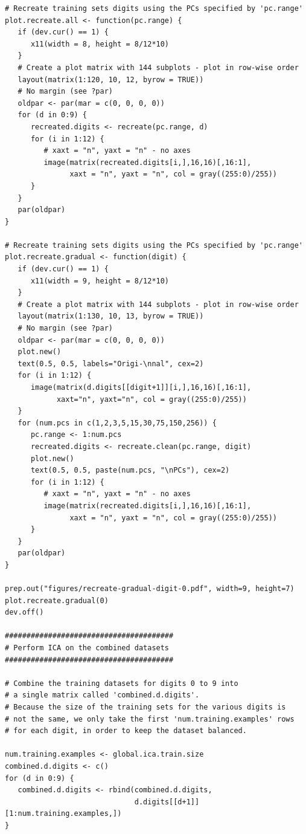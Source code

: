 \documentclass[12pt,article,oneside]{memoir}
\begin{document}
\begin{verbatim}
# Recreate training sets digits using the PCs specified by 'pc.range'
plot.recreate.all <- function(pc.range) {
   if (dev.cur() == 1) {
      x11(width = 8, height = 8/12*10) 
   }
   # Create a plot matrix with 144 subplots - plot in row-wise order
   layout(matrix(1:120, 10, 12, byrow = TRUE))
   # No margin (see ?par)
   oldpar <- par(mar = c(0, 0, 0, 0))
   for (d in 0:9) {
      recreated.digits <- recreate(pc.range, d)
      for (i in 1:12) {
         # xaxt = "n", yaxt = "n" - no axes
         image(matrix(recreated.digits[i,],16,16)[,16:1],
               xaxt = "n", yaxt = "n", col = gray((255:0)/255))
      }
   }
   par(oldpar)
}

# Recreate training sets digits using the PCs specified by 'pc.range'
plot.recreate.gradual <- function(digit) {
   if (dev.cur() == 1) {
      x11(width = 9, height = 8/12*10) 
   }
   # Create a plot matrix with 144 subplots - plot in row-wise order
   layout(matrix(1:130, 10, 13, byrow = TRUE))
   # No margin (see ?par)
   oldpar <- par(mar = c(0, 0, 0, 0))
   plot.new()
   text(0.5, 0.5, labels="Origi-\nnal", cex=2)
   for (i in 1:12) {
      image(matrix(d.digits[[digit+1]][i,],16,16)[,16:1],
            xaxt="n", yaxt="n", col = gray((255:0)/255))
   }
   for (num.pcs in c(1,2,3,5,15,30,75,150,256)) {
      pc.range <- 1:num.pcs
      recreated.digits <- recreate.clean(pc.range, digit)
      plot.new()
      text(0.5, 0.5, paste(num.pcs, "\nPCs"), cex=2)
      for (i in 1:12) {
         # xaxt = "n", yaxt = "n" - no axes
         image(matrix(recreated.digits[i,],16,16)[,16:1], 
               xaxt = "n", yaxt = "n", col = gray((255:0)/255))
      }
   }
   par(oldpar)
}

prep.out("figures/recreate-gradual-digit-0.pdf", width=9, height=7)
plot.recreate.gradual(0)
dev.off()

#######################################
# Perform ICA on the combined datasets
#######################################

# Combine the training datasets for digits 0 to 9 into
# a single matrix called 'combined.d.digits'.
# Because the size of the training sets for the various digits is
# not the same, we only take the first 'num.training.examples' rows 
# for each digit, in order to keep the dataset balanced.

num.training.examples <- global.ica.train.size
combined.d.digits <- c()
for (d in 0:9) {
   combined.d.digits <- rbind(combined.d.digits,
                              d.digits[[d+1]][1:num.training.examples,])
}


\end{verbatim}
\end{document}

